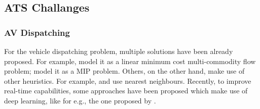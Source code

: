 %
%
\subsection{ATS Challanges}\label{sec:ats_challenges}

\subsubsection*{AV Dispatching}
For the vehicle dispatching problem, multiple solutions have been already proposed. For example,  model it as a linear minimum cost multi-commodity flow problem;  model it as a MIP problem. Others, on the other hand, make use of other heuristics. For example,  and  use nearest neighbours. Recently, to improve real-time capabilities, some approaches have been proposed which make use of deep learning, like for e.g., the one proposed by .\\

